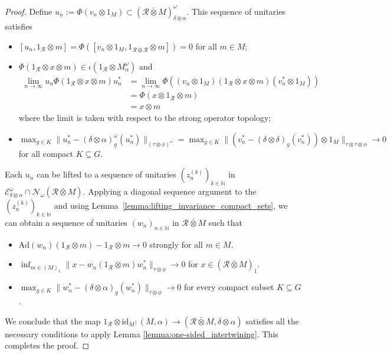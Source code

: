 \documentclass[11pt,a4paper]{article}
\theoremstyle{definition}
\theoremstyle{remark}
\numberwithin{equation}{section}
\numberwithin{theorem}{section}
\newcommand{\N}{\mathbb{N}}
\begin{document}
\begin{proof}
Define $u_n := \Phi(v_n \otimes 1_M) \subset (\mathcal{R} \bar{\otimes} M)^\omega_{\delta \otimes \alpha}$. This sequence of unitaries satisfies
\begin{itemize} 
\item $[u_n, 1_\mathcal{R} \otimes m] = \Phi([v_n \otimes 1_M, 1_{\mathcal{R} \bar{\otimes} \mathcal{R}} \otimes m]) = 0$ for all $m \in M$;
\item  $\Phi(1_\mathcal{R} \otimes x \otimes m) \in \iota(1_\mathcal{R} \otimes M^\omega_\alpha)$ and
\begin{align*}
\lim_{n \rightarrow \infty} u_n \Phi(1_\mathcal{R} \otimes x \otimes m) u_n^* &=\lim_{n \rightarrow \infty} \Phi((v_n \otimes 1_M)(1_\mathcal{R} \otimes x \otimes m)(v_n^* \otimes 1_M))\\
&=\Phi(x \otimes 1_\mathcal{R} \otimes m) \\&= x \otimes m
\end{align*}
where the limit is taken with respect to the strong operator topology;
\item $\displaystyle \max_{g \in K} \|u_n^* - (\delta \otimes \alpha)^\omega_g(u_n^*)\|_{(\tau \otimes \phi)^\omega} = \max_{g \in K} \|(v_n^* - (\delta \otimes \delta)_g(v_n^*)) \otimes 1_M\|_{\tau \otimes \tau \otimes \phi} \to 0$ for all compact $K \subseteq G$.
\end{itemize}

 Each $u_n$ can be lifted to a sequence of unitaries $(z_n^{(k)})_{k\in \N}$ in $\mathcal{E}_{\delta \otimes \alpha}^\omega \cap \mathcal{N}_\omega(\mathcal{R} \bar{\otimes} M)$.
 Applying a diagonal sequence argument to the $(z_n^{(k)})_{k\in \N}$ and using Lemma~\ref{lemma:lifting_invariance_compact_sets}, we can obtain a sequence of unitaries $(w_n)_{n \in \N}$ in $\mathcal{R} \bar{\otimes} M$ such that
\begin{itemize}
\item $\mathrm{Ad}(w_n)(1_\mathcal{R} \otimes m) - 1_\mathcal{R} \otimes m \rightarrow 0$ strongly for all $m \in M$.
\item $\inf_{m \in (M)_1}\|x - w_n(1_\mathcal{R} \otimes m)w_n^*\|_{\tau \otimes \phi} \rightarrow 0$ for $x \in (\mathcal{R} \bar{\otimes}M)_1$.
\item $\max_{g \in K} \|w_n^* - (\delta \otimes \alpha)_g(w_n^*)\|_{\tau \otimes \phi} \rightarrow 0$ for every compact subset $K \subseteq G$.
\end{itemize}
We conclude that the map $1_\mathcal{R} \otimes \mathrm{id}_M\colon (M, \alpha) \rightarrow (\mathcal{R} \bar{\otimes} M, \delta \otimes \alpha)$ satisfies all the necessary conditions to apply Lemma \ref{lemma:one-sided_intertwining}.
This completes the proof.
\end{proof}
\end{document}
